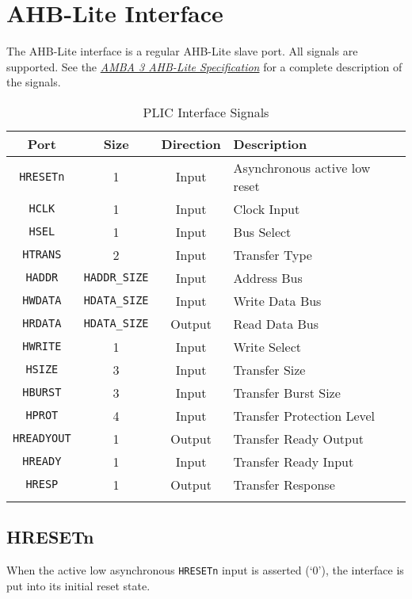 \section{AHB-Lite Interface}

The AHB-Lite interface is a regular AHB-Lite slave port. All signals are
supported. See the
\emph{\href{https://www.arm.com/products/system-ip/amba-specifications}{AMBA
3 AHB-Lite Specification}} for a complete description of the signals.

\begin{longtable}[c]{@{\extracolsep{\fill}}cccl@{}}	
		\toprule 
		\textbf{Port} & \textbf{Size} & \textbf{Direction} & \textbf{Description}\\
		\midrule
		\endhead 
		\texttt{HRESETn} & 1 & Input & Asynchronous active low reset\\
		\texttt{HCLK} & 1 & Input & Clock Input\\
		\texttt{HSEL} & 1 & Input & Bus Select\\
		\texttt{HTRANS} & 2 & Input & Transfer Type\\
		\texttt{HADDR} & \texttt{HADDR\_SIZE} & Input & Address Bus\\
		\texttt{HWDATA} & \texttt{HDATA\_SIZE} & Input & Write Data Bus\\
		\texttt{HRDATA} & \texttt{HDATA\_SIZE} & Output & Read Data Bus\\
		\texttt{HWRITE} & 1 & Input & Write Select\\
		\texttt{HSIZE} & 3 & Input & Transfer Size\\
		\texttt{HBURST} & 3 & Input & Transfer Burst Size\\
		\texttt{HPROT} & 4 & Input & Transfer Protection Level\\
		\texttt{HREADYOUT} & 1 & Output & Transfer Ready Output\\
		\texttt{HREADY} & 1 & Input & Transfer Ready Input\\
		\texttt{HRESP} & 1 & Output & Transfer Response\\
		\bottomrule 	
	\caption{PLIC Interface Signals}
	\label{tab:AHBIF}
\end{longtable}

\subsection{HRESETn}

When the active low asynchronous \texttt{HRESETn} input is asserted
(`0'), the interface is put into its initial reset state.

